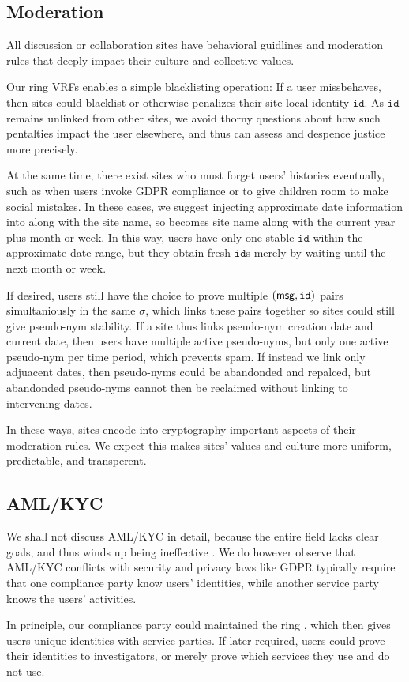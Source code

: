 \subsection{Moderation}
\label{subsec:moderation}

All discussion or collaboration sites have behavioral guidlines and
moderation rules that deeply impact their culture and collective values.

Our ring VRFs enables a simple blacklisting operation:
If a user missbehaves, then sites could blacklist or otherwise penalizes
their site local identity $\mathtt{id}$.
As $\mathtt{id}$ remains unlinked from other sites, we avoid thorny
questions about how such pentalties impact the user elsewhere, and thus
can assess and despence justice more precisely. 

At the same time, there exist sites who must forget users' histories
eventually, such as when users invoke GDPR compliance or to give children
room to make social mistakes.  In these cases, we suggest injecting
approximate date information into \msg along with the site name,
so \msg becomes site name along with the current year plus month or week.
In this way, users have only one stable $\mathtt{id}$ within the
approximate date range, but they obtain fresh $\mathtt{id}$s merely
by waiting until the next month or week.

If desired, users still have the choice to prove multiple $(\mathsf{msg},\mathtt{id})$
pairs simultaniously in the same $\sigma$, which links these pairs
together so sites could still give pseudo-nym stability.
If a site thus links pseudo-nym creation date and current date, then
users have multiple active pseudo-nyms, but only one active pseudo-nym
per time period, which prevents spam.  If instead we link only adjuacent
dates, then pseudo-nyms could be abandonded and repalced, but abandonded
pseudo-nyms cannot then be reclaimed without linking to intervening dates.

In these ways, sites encode into cryptography important aspects of
their moderation rules.  We expect this makes sites' values and culture
more uniform, predictable, and transperent.

\subsection{AML/KYC}

We shall not discuss AML/KYC in detail, because the entire field lacks
clear goals, and thus winds up being ineffective \cite{???}.
We do however observe that AML/KYC conflicts with security and privacy
laws like GDPR typically require that one compliance party know users'
identities, while another service party knows the users' activities.

In principle, our compliance party could maintained the ring \ctx,
which then gives users unique identities with service parties.
If later required, users could prove their identities to investigators,
or merely prove which services they use and do not use. 

